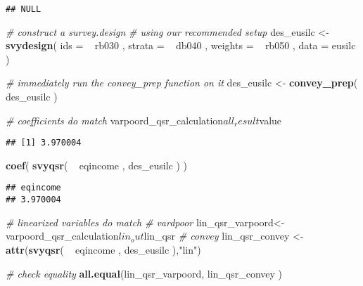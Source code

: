 \documentclass[]{book}
\newenvironment{Shaded}{\begin{snugshade}}{\end{snugshade}}
\newcommand{\KeywordTok}[1]{\textcolor[rgb]{0.13,0.29,0.53}{\textbf{{#1}}}}
\newcommand{\DataTypeTok}[1]{\textcolor[rgb]{0.13,0.29,0.53}{{#1}}}
\newcommand{\StringTok}[1]{\textcolor[rgb]{0.31,0.60,0.02}{{#1}}}
\newcommand{\CommentTok}[1]{\textcolor[rgb]{0.56,0.35,0.01}{\textit{{#1}}}}
\newcommand{\NormalTok}[1]{{#1}}
\theoremstyle{definition}
\theoremstyle{definition}
\theoremstyle{remark}
\begin{document}
\begin{verbatim}
## NULL
\end{verbatim}

\begin{Shaded}
\begin{Highlighting}[]
\CommentTok{# construct a survey.design}
\CommentTok{# using our recommended setup}
\NormalTok{des_eusilc <-}\StringTok{ }
\StringTok{    }\KeywordTok{svydesign}\NormalTok{( }
        \DataTypeTok{ids =} \NormalTok{~}\StringTok{ }\NormalTok{rb030 , }
        \DataTypeTok{strata =} \NormalTok{~}\StringTok{ }\NormalTok{db040 ,  }
        \DataTypeTok{weights =} \NormalTok{~}\StringTok{ }\NormalTok{rb050 , }
        \DataTypeTok{data =} \NormalTok{eusilc}
    \NormalTok{)}

\CommentTok{# immediately run the convey_prep function on it}
\NormalTok{des_eusilc <-}\StringTok{ }\KeywordTok{convey_prep}\NormalTok{( des_eusilc )}

\CommentTok{# coefficients do match}
\NormalTok{varpoord_qsr_calculation$all_result$value}
\end{Highlighting}
\end{Shaded}

\begin{verbatim}
## [1] 3.970004
\end{verbatim}

\begin{Shaded}
\begin{Highlighting}[]
\KeywordTok{coef}\NormalTok{( }\KeywordTok{svyqsr}\NormalTok{( ~}\StringTok{ }\NormalTok{eqincome , des_eusilc ) )}
\end{Highlighting}
\end{Shaded}

\begin{verbatim}
## eqincome 
## 3.970004
\end{verbatim}

\begin{Shaded}
\begin{Highlighting}[]
\CommentTok{# linearized variables do match}
\CommentTok{# vardpoor}
\NormalTok{lin_qsr_varpoord<-}\StringTok{ }\NormalTok{varpoord_qsr_calculation$lin_out$lin_qsr}
\CommentTok{# convey }
\NormalTok{lin_qsr_convey <-}\StringTok{ }\KeywordTok{attr}\NormalTok{(}\KeywordTok{svyqsr}\NormalTok{( ~}\StringTok{ }\NormalTok{eqincome , des_eusilc ),}\StringTok{"lin"}\NormalTok{)}

\CommentTok{# check equality}
\KeywordTok{all.equal}\NormalTok{(lin_qsr_varpoord, lin_qsr_convey )}
\end{Highlighting}
\end{Shaded}
\end{document}
